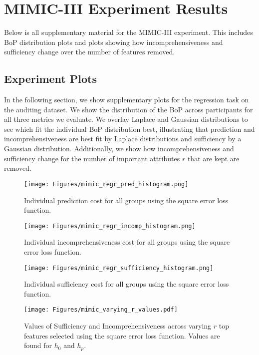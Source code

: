 \section{MIMIC-III Experiment Results} 
\label{sec:MIMIC_Results} 

Below is all supplementary material for the MIMIC-III experiment. This includes BoP distribution plots and plots showing how incomprehensiveness and sufficiency change over the number of features removed. 




\subsection{Experiment Plots}\label{subsec:mimic_plots}
In the following section, we show supplementary plots for the regression task on the auditing dataset. We show the distribution of the BoP across participants for all three metrics we evaluate. We overlay Laplace and Gaussian distributions to see which fit the individual BoP distribution best, illustrating that prediction and incomprehensiveness are best fit by Laplace distributions and sufficiency by a Gaussian distribution. Additionally, we show how incomprehensiveness and sufficiency change for the number of important attributes $r$ that are kept are removed.

\begin{figure}[ht]
    \centering
    \texttt{[image: Figures/mimic\_regr\_pred\_histogram.png]}
    \caption{Individual prediction cost for all groups using the square error loss function.}
    \label{fig:mimic-regr-pred}
\end{figure}

\begin{figure}[ht]
    \centering
    \texttt{[image: Figures/mimic\_regr\_incomp\_histogram.png]}
    \caption{Individual incomprehensiveness cost for all groups using the square error loss function.}
    \label{fig:mimic-regr-incomp}
\end{figure}

\begin{figure}[ht]
    \centering

    \texttt{[image: Figures/mimic\_regr\_sufficiency\_histogram.png]}
    \caption{Individual sufficiency cost for all groups using the square error loss function.}
    \label{fig:mimic-regr-suff}
\end{figure}

\begin{figure}[ht]
    \centering
    \texttt{[image: Figures/mimic\_varying\_r\_values.pdf]}
    \caption{Values of Sufficiency and Incomprehensiveness across varying $r$ top features selected using the square error loss function. Values are found for $h_0$ and $h_p$.}
    \label{fig:mimic-r-varying}
\end{figure}
